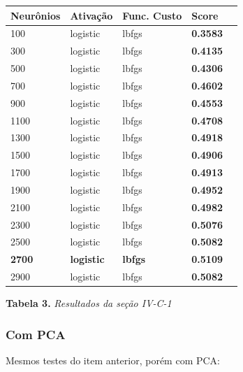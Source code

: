 \documentclass[conference]{IEEEtran}
\begin{document}
\begin{center}
\begin{tabular}{| l | l | l | l | l |} 
\hline
\textbf{Neurônios}                 & \textbf{Ativação} &\textbf{ Func. Custo} & \textbf{Score}  \\ \hline
100                       & logistic & lbfgs       & \textbf{0.3583} \\ \hline
300                       & logistic & lbfgs       & \textbf{0.4135} \\ \hline
500 					  & logistic & lbfgs       & \textbf{0.4306} \\ \hline
700                       & logistic & lbfgs       & \textbf{0.4602} \\ \hline
900                       & logistic & lbfgs       & \textbf{0.4553} \\ \hline
1100                      & logistic & lbfgs       & \textbf{0.4708} \\ \hline
1300                      & logistic & lbfgs       & \textbf{0.4918} \\ \hline
1500                      & logistic & lbfgs       & \textbf{0.4906} \\ \hline
1700                      & logistic & lbfgs       & \textbf{0.4913} \\ \hline
1900                      & logistic & lbfgs       & \textbf{0.4952} \\ \hline
2100                      & logistic & lbfgs       & \textbf{0.4982} \\ \hline
2300                      & logistic & lbfgs       & \textbf{0.5076} \\ \hline
2500                      & logistic & lbfgs       & \textbf{0.5082} \\ \hline
\textbf{2700}                      & \textbf{logistic} & \textbf{lbfgs}       & \textbf{0.5109} \\ \hline
2900                      & logistic & lbfgs       & \textbf{0.5082} \\ \hline
\end{tabular}
\newline
\newline
\textbf{Tabela 3.} \textit{Resultados da seção IV-C-1}
\end{center}

\subsubsection{Com PCA}
Mesmos testes do item anterior, porém com PCA:
\end{document}
